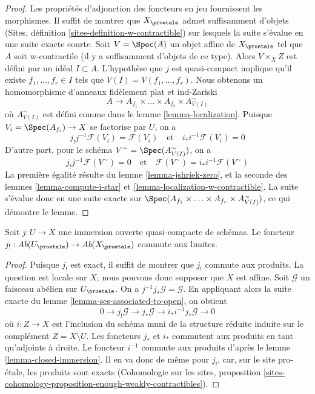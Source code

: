 \begin{proof}
Les propriétés d'adjonction des foncteurs en jeu fournissent les morphismes.
Il suffit de montrer que $X_\proetale$ admet suffisamment d'objets
(Sites, définition \ref{sites-definition-w-contractible}) sur lesquels
la suite s'évalue en une suite exacte courte.
Soit $V = \Spec(A)$ un objet affine de $X_\proetale$
tel que $A$ soit w-contractile (il y a suffisamment d'objets de ce type).
Alors $V \times_X Z$ est défini par un idéal $I \subset A$.
L'hypothèse que $j$ est quasi-compact implique qu'il existe
$f_1, \ldots, f_r \in I$ tels que $V(I) = V(f_1, \ldots, f_r)$.
Nous obtenons un homomorphisme d'anneaux fidèlement plat et ind-Zariski
$$
A \longrightarrow A_{f_1} \times \ldots \times A_{f_r} \times
A_{V(I)}^\sim
$$
où $A_{V(I)}^\sim$ est défini comme dans le lemme \ref{lemma-localization}.
Puisque $V_i = \Spec(A_{f_i}) \to X$ se factorise par $U$, on a
$$
j_!j^{-1}\mathcal{F}(V_i) = \mathcal{F}(V_i)
\quad\text{et}\quad
i_*i^{-1}\mathcal{F}(V_i) = 0
$$
D'autre part, pour le schéma $V^\sim = \Spec(A_{V(I)}^\sim)$,
on a
$$
j_!j^{-1}\mathcal{F}(V^\sim) = 0
\quad\text{et}\quad
\mathcal{F}(V^\sim) = i_*i^{-1}\mathcal{F}(V^\sim)
$$
La première égalité résulte du lemme \ref{lemma-jshriek-zero},
et la seconde des
lemmes \ref{lemma-compute-i-star} et \ref{lemma-localization-w-contractible}.
La suite s'évalue donc en une suite exacte sur
$\Spec(A_{f_1} \times \ldots \times A_{f_r} \times A_{V(I)}^\sim)$,
ce qui démontre le lemme.
\end{proof}

\begin{lemma}
\label{lemma-j-shriek-limits}
Soit $j : U \to X$ une immersion ouverte quasi-compacte
de schémas. Le foncteur
$j_! : \textit{Ab}(U_\proetale) \to \textit{Ab}(X_\proetale)$
commute aux limites.
\end{lemma}

\begin{proof}
Puisque $j_!$ est exact, il suffit de montrer que $j_!$ commute aux produits.
La question est locale sur $X$; nous pouvons donc supposer que $X$ est affine.
Soit $\mathcal{G}$ un faisceau abélien sur $U_\proetale$.
On a $j^{-1}j_*\mathcal{G} = \mathcal{G}$. En appliquant alors
la suite exacte du lemme \ref{lemma-ses-associated-to-open},
on obtient
$$
0 \to j_!\mathcal{G} \to j_*\mathcal{G} \to i_*i^{-1}j_*\mathcal{G} \to 0
$$
où $i : Z \to X$ est l'inclusion du schéma muni de la structure réduite
induite sur le complément $Z = X \setminus U$.
Les foncteurs $j_*$ et $i_*$ commutent aux produits en tant qu'adjoints à droite.
Le foncteur $i^{-1}$ commute aux produits d'après le
lemme \ref{lemma-closed-immersion}.
Il en va donc de même pour $j_!$, car, sur le site pro-\'etale, les produits
sont exacts
(Cohomologie sur les sites, proposition
\ref{sites-cohomology-proposition-enough-weakly-contractibles}).
\end{proof}




